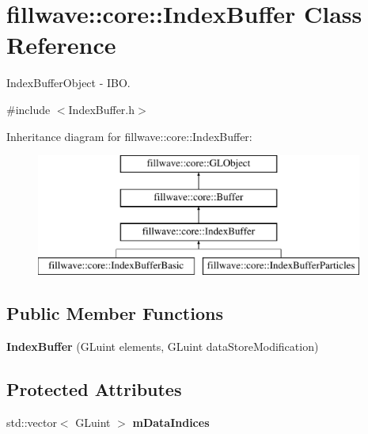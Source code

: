 \hypertarget{classfillwave_1_1core_1_1IndexBuffer}{}\section{fillwave\+:\+:core\+:\+:Index\+Buffer Class Reference}
\label{classfillwave_1_1core_1_1IndexBuffer}


Index\+Buffer\+Object -\/ I\+B\+O.  




{\ttfamily \#include $<$Index\+Buffer.\+h$>$}

Inheritance diagram for fillwave\+:\+:core\+:\+:Index\+Buffer\+:\begin{figure}[H]
\begin{center}
\leavevmode
\includegraphics[height=4.000000cm]{classfillwave_1_1core_1_1IndexBuffer}
\end{center}
\end{figure}
\subsection*{Public Member Functions}
\begin{DoxyCompactItemize}
\item 
\hypertarget{classfillwave_1_1core_1_1IndexBuffer_a93b5036c653fcb090013d6395bcae6c5}{}{\bfseries Index\+Buffer} (G\+Luint elements, G\+Luint data\+Store\+Modification)\label{classfillwave_1_1core_1_1IndexBuffer_a93b5036c653fcb090013d6395bcae6c5}

\end{DoxyCompactItemize}
\subsection*{Protected Attributes}
\begin{DoxyCompactItemize}
\item 
\hypertarget{classfillwave_1_1core_1_1IndexBuffer_adbb519ab404fbfd8399bdd0250dc17a1}{}std\+::vector$<$ G\+Luint $>$ {\bfseries m\+Data\+Indices}\label{classfillwave_1_1core_1_1IndexBuffer_adbb519ab404fbfd8399bdd0250dc17a1}

\end{DoxyCompactItemize}

